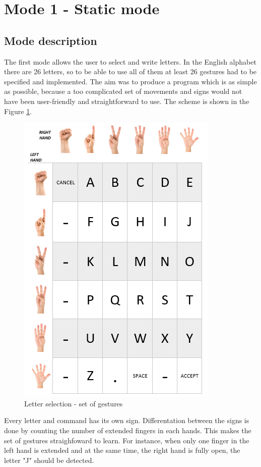 \section{Mode 1 - Static mode}
\subsection {Mode description}
The first mode allows the user to select and write letters. In the English alphabet there are 26 letters, so to be able to use all of them at least 26 gestures had to be specified and implemented. The aim was to produce a program which is as simple as possible, because a too complicated set of movements and signs would not have been user-friendly and straightforward to use. The scheme is shown in the Figure \ref{fig:letters}.

\begin{figure}[H]
	\includegraphics{static_gestures}
	\centering
	\caption{Letter selection - set of gestures}
	\label{fig:letters}
\end{figure}

Every letter and command has its own sign. Differentation between the signs is done by counting the number of extended fingers in each hands. This makes the set of gestures straighfoward to learn. For instance, when only one finger in the left hand is extended and at the same time, the right hand is fully open, the letter "J" should be detected.\\

